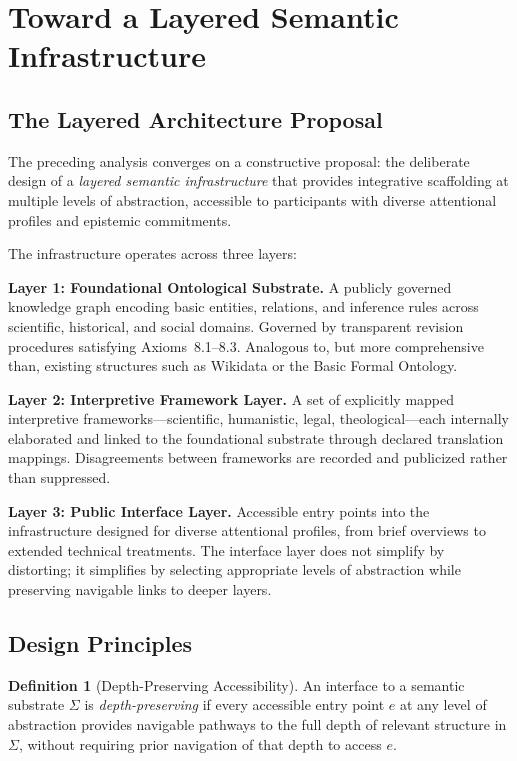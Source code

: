 \documentclass[12pt]{article}
\theoremstyle{definition}
\newtheorem{definition}{Definition}[section]
\theoremstyle{plain}
\begin{document}
\section{Toward a Layered Semantic Infrastructure}
\label{sec:layered}

\subsection{The Layered Architecture Proposal}

The preceding analysis converges on a constructive proposal: the deliberate design of a \emph{layered semantic infrastructure} that provides integrative scaffolding at multiple levels of abstraction, accessible to participants with diverse attentional profiles and epistemic commitments.

The infrastructure operates across three layers:

\textbf{Layer 1: Foundational Ontological Substrate.} A publicly governed knowledge graph encoding basic entities, relations, and inference rules across scientific, historical, and social domains. Governed by transparent revision procedures satisfying Axioms~8.1--8.3. Analogous to, but more comprehensive than, existing structures such as Wikidata or the Basic Formal Ontology.

\textbf{Layer 2: Interpretive Framework Layer.} A set of explicitly mapped interpretive frameworks---scientific, humanistic, legal, theological---each internally elaborated and linked to the foundational substrate through declared translation mappings. Disagreements between frameworks are recorded and publicized rather than suppressed.

\textbf{Layer 3: Public Interface Layer.} Accessible entry points into the infrastructure designed for diverse attentional profiles, from brief overviews to extended technical treatments. The interface layer does not simplify by distorting; it simplifies by selecting appropriate levels of abstraction while preserving navigable links to deeper layers.

\subsection{Design Principles}

\begin{definition}[Depth-Preserving Accessibility]
An interface to a semantic substrate $\Sigma$ is \emph{depth-preserving} if every accessible entry point $e$ at any level of abstraction provides navigable pathways to the full depth of relevant structure in $\Sigma$, without requiring prior navigation of that depth to access $e$.
\end{definition}
\end{document}
